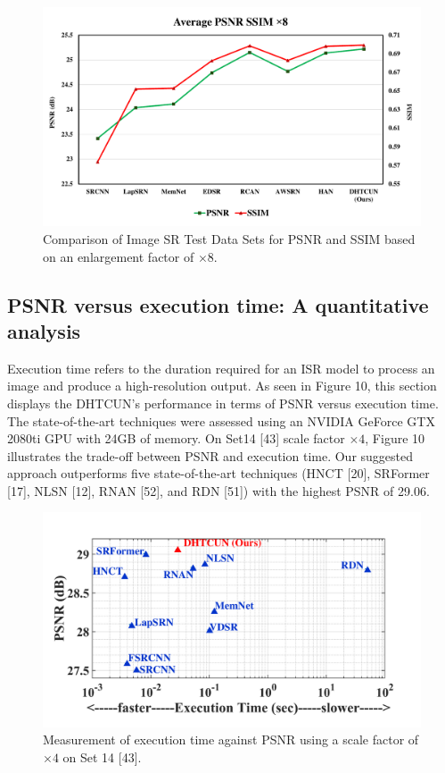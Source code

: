\documentclass{ieeeaccess}
\begin{document}
\begin{figure}[ht]
  \includegraphics[width=\linewidth]{9FIGURE.pdf}
  \caption{Comparison of Image SR Test Data Sets for PSNR and SSIM based on an enlargement factor of $\times8$.}
  \label{fig:9}
\end{figure}

\subsection{PSNR versus execution time: A quantitative analysis }

Execution time refers to the duration required for an ISR model to process an image and produce a high-resolution output. As seen in Figure 10, this section displays the DHTCUN's performance in terms of PSNR versus execution time. The state-of-the-art techniques were assessed using an NVIDIA GeForce GTX 2080ti GPU with 24GB of memory. On Set14 [43] scale factor $\times4$, Figure 10 illustrates the trade-off between PSNR and execution time. Our suggested approach outperforms five state-of-the-art techniques (HNCT [20], SRFormer [17], NLSN [12], RNAN [52], and RDN [51]) with the highest PSNR of 29.06. 

\begin{figure}[ht]
  \includegraphics[width=\linewidth]{10FIGURE.pdf}
  \caption{Measurement of execution time against PSNR using a scale factor of $\times4$ on Set 14 [43].}
  \label{fig:10}
\end{figure}
\end{document}
